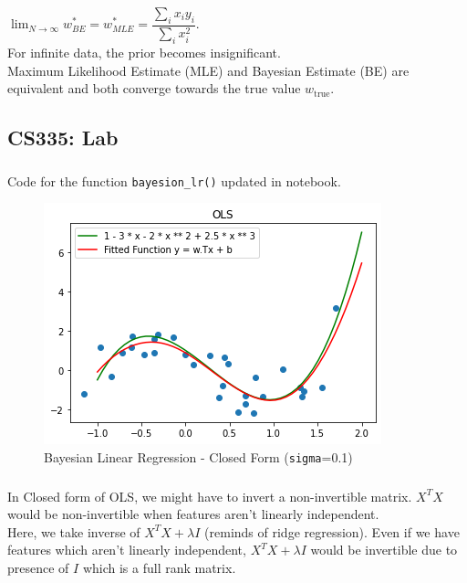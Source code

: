 \documentclass[12pt, fleqn]{article}
\begin{document}
\subsubsection{}
$\lim_{N \to \infty} w^*_{BE} = w^*_{MLE} = \dfrac{\sum_i x_i y_i}{\sum_i x_i^2}$. \\
For infinite data, the prior becomes insignificant. \\
Maximum Likelihood Estimate (MLE) and Bayesian Estimate (BE) are equivalent and both converge towards the true value $w_{\text{true}}$.

\subsection{CS335: Lab}
\subsubsection{}
Code for the function \verb!bayesion_lr()! updated in notebook.
\begin{figure}[H]
  \centering
  \includegraphics[scale=0.7]{bayesion_lr.png}
  \caption{Bayesian Linear Regression - Closed Form (\texttt{sigma}=0.1)}
\end{figure}

\subsubsection{}
In Closed form of OLS, we might have to invert a non-invertible matrix. $X^T X$ would be non-invertible when features aren't linearly independent. \\
Here, we take inverse of $X^T X + \lambda I$ (reminds of ridge regression). Even if we have features which aren't linearly independent, $X^T X + \lambda I$ would be invertible due to presence of $I$ which is a full rank matrix.


\newpage
\end{document}
